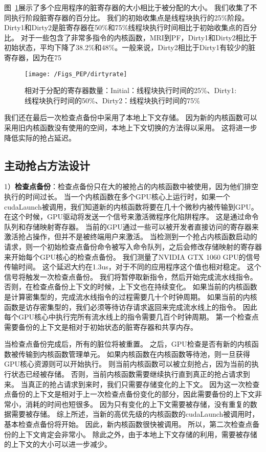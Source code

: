 图~\ref{fig:dirtyrate}展示了多个应用程序的脏寄存器的大小相比于被分配的大小。
我们收集了不同执行阶段脏寄存器的百分比。
我们的初始收集点是线程块执行的25\%阶段。
Dirty1和Dirty2是脏寄存器在50\%和75\%线程块执行时间相比于初始收集点的百分比。
对于一些包含了非常多指令的内核函数，MRI到PF，Dirty1和Dirty2相比于初始状态，平均下降了38.2\%和48\%。一般来说，Dirty2相比于Dirty1有较少的脏寄存器，因为在75%

\begin{figure}[htbp] %
  \centering
  \texttt{[image: /Figs\_PEP/dirtyrate]}
  \caption{相对于分配的寄存器数量：Initial：线程块执行时间的25\%、Dirty1: 线程块执行时间的50\%、Dirty2：线程块执行时间的75\%}
  \label{fig:dirtyrate}
\end{figure}


我们还在最后一次检查点备份中采用了本地上下文存储。
因为新的内核函数可以采用旧内核函数没有使用的空间，本地上下文切换的方法得以采用。
这将进一步降低实际的抢占延迟。

\subsection{主动抢占方法设计}

1）\textbf{检查点备份}：检查点备份只在大的被抢占的内核函数中被使用，因为他们排空执行的时间过长。
当一个内核函数在多个GPU核心上运行时，如果一个cudaLaunch被调用，我们知道新的内核函数将要在几十个微秒内被传输到GPU。
在这个时候，GPU驱动将发送一个信号来激活微程序化陷阱程序。
这是通过命令队列和存储映射寄存器。
当前的GPU通过一些可以被开发者直接访问的寄存器来激活抢占操作，但并不是被终端用户来激活。
当检测到一个抢占内核函数启动的请求，则一个初始检查点备份命令被写入命令队列，之后会修改存储映射的寄存器来开始每个GPU核心的检查点备份。
我们测量了NVIDIA GTX 1060 GPU的信号传输时间。
这个延迟大约在1.3us，对于不同的应用程序这个值也相对稳定。
这个信号将触发一次检查点备份。
我们将暂停取新指令，然后开始完成流水线指令。
否则，在检查点备份上下文的时候，上下文也在持续变化。
如果当前的内核函数是计算密集型的，完成流水线指令的过程需要几十个时钟周期。
如果当前的内核函数是访存密集型的，我们必须等待访存请求返回来完成流水线上的指令。
因此每个GPU核心中执行完所有流水线上的指令需要几百个时钟周期。
第一个检查点需要备份的上下文是相对于初始状态的脏寄存器和共享内存。

当检查点备份完成后，所有的脏位将被重置。
之后，GPU检查是否有新的内核函数被传输到内核函数管理单元。
如果内核函数在内核函数等待池，则一旦获得GPU核心资源则可以开始执行。
则当前内核函数可以被立刻抢占，因为当前的执行状态已经被存储。
否则，当前内核函数需要继续执行直到真正的抢占请求到来。
当真正的抢占请求到来时，我们只需要存储变化的上下文。
因为这一次检查点备份的上下文是相对于上一次检查点备份变化的部分，因此需要备份的上下文非常小，消耗的时间也短很多。
因为只有变化的上下文需要被存储，没有重复的数据需要被存储。
综上所述，当新的高优先级的内核函数的cudaLaunch被调用时，基本检查点备份将开始。
因此，新内核函数很快被调用。
所以，第二次检查点备份的上下文肯定会非常小。
除此之外，由于本地上下文存储的利用，需要被存储的上下文的大小可以进一步减少。

